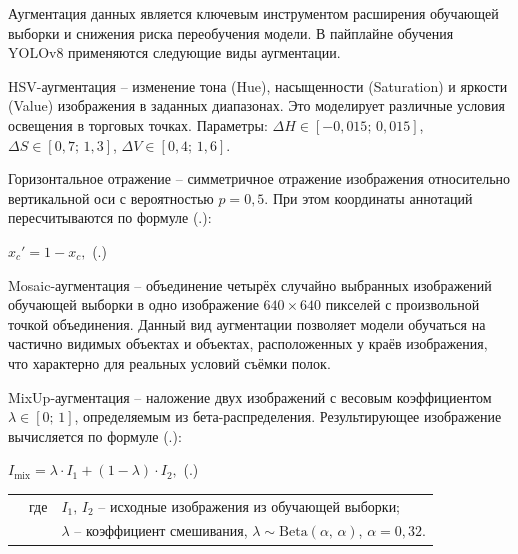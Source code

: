 {  \par \redline Аугментация данных является ключевым инструментом расширения обучающей выборки и снижения риска переобучения модели. В пайплайне обучения YOLOv8 применяются следующие виды аугментации.

  \par \redline HSV-аугментация {--} изменение тона (Hue), насыщенности (Saturation) и яркости (Value) изображения в заданных диапазонах. Это моделирует различные условия освещения в торговых точках. Параметры: $\Delta H \in [-0{,}015;\, 0{,}015]$, $\Delta S \in [0{,}7;\, 1{,}3]$, $\Delta V \in [0{,}4;\, 1{,}6]$.

  \par \redline Горизонтальное отражение {--} симметричное отражение изображения относительно вертикальной оси с вероятностью $p = 0{,}5$. При этом координаты аннотаций пересчитываются по формуле (\thechaptercntr .\theformulacntr):

  \formulaspace 
  \par \redline $x_c' = 1 - x_c,$
  \hfill (\thechaptercntr .\theformulacntr) \hspace*{-0.5cm}\redline
  \formulaspace \addtocounter{formulacntr}{1}

  \par \redline Mosaic-аугментация {--} объединение четырёх случайно выбранных изображений обучающей выборки в одно изображение $640 \times 640$ пикселей с произвольной точкой объединения. Данный вид аугментации позволяет модели обучаться на частично видимых объектах и объектах, расположенных у краёв изображения, что характерно для реальных условий съёмки полок.

  \par \redline MixUp-аугментация {--} наложение двух изображений с весовым коэффициентом $\lambda \in [0;\,1]$, определяемым из бета-распределения. Результирующее изображение вычисляется по формуле (\thechaptercntr .\theformulacntr):

  \formulaspace 
  \par \redline $I_{\mathrm{mix}} = \lambda \cdot I_1 + (1 - \lambda) \cdot I_2,$
  \hfill (\thechaptercntr .\theformulacntr) \hspace*{-0.5cm}\redline
  \formulaspace \addtocounter{formulacntr}{1}

  \begin{tabular}{p{0.875cm}p{0.3cm}p{15.175cm}}
      & где  & $I_1,\, I_2$ {--} исходные изображения из обучающей выборки; \\
      &      & $\lambda$ {--} коэффициент смешивания, $\lambda \sim \mathrm{Beta}(\alpha,\, \alpha)$, $\alpha = 0{,}32$. \\
  \end{tabular}
  \vspace{13pt}

}
